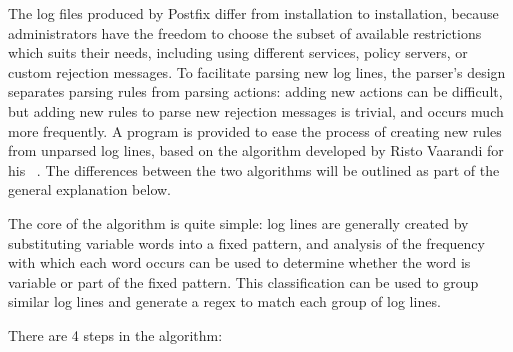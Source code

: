 The log files produced by Postfix differ from installation to installation,
because administrators have the freedom to choose the subset of available
restrictions which suits their needs, including using different
 services, policy servers, or custom rejection messages.  To
facilitate parsing new log lines, the parser's design separates parsing
rules from parsing actions: adding new actions can be difficult, but adding
new rules to parse new rejection messages is trivial, and occurs much more
frequently.  A program is provided to ease the process of creating new
rules from unparsed log lines, based on the algorithm developed by Risto
Vaarandi for his ~\cite{slct-paper}.  The differences between
the two algorithms will be outlined as part of the general explanation
below.

The core of the  algorithm is quite simple: log lines are
generally created by substituting variable words into a fixed pattern, and
analysis of the frequency with which each word occurs can be used to
determine whether the word is variable or part of the fixed pattern.  This
classification can be used to group similar log lines and generate a regex
to match each group of log lines.

There are 4 steps in the algorithm:

